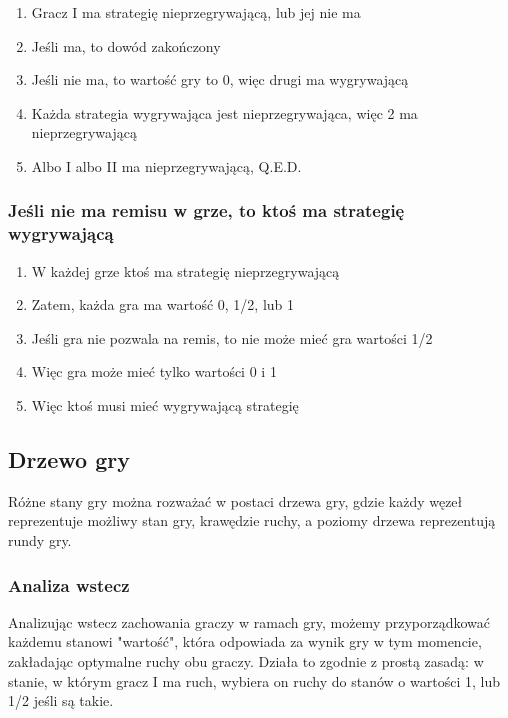 \documentclass{../notatki}
\begin{document}
\begin{enumerate}
  \item Gracz I ma strategię nieprzegrywającą, lub jej nie ma
  \item Jeśli ma, to dowód zakończony
  \item Jeśli nie ma, to wartość gry to 0, więc drugi ma wygrywającą
  \item Każda strategia wygrywająca jest nieprzegrywająca, więc 2 ma
    nieprzegrywającą
  \item Albo I albo II ma nieprzegrywającą, Q.E.D.
\end{enumerate}

\subsubsection{Jeśli nie ma remisu w grze, to ktoś ma strategię wygrywającą}

\begin{enumerate}
  \item W każdej grze ktoś ma strategię nieprzegrywającą
  \item Zatem, każda gra ma wartość 0, 1/2, lub 1
  \item Jeśli gra nie pozwala na remis, to nie może mieć gra wartości 1/2
  \item Więc gra może mieć tylko wartości 0 i 1
  \item Więc ktoś musi mieć wygrywającą strategię
\end{enumerate}

\subsection{Drzewo gry}

Różne stany gry można rozważać w postaci drzewa gry, gdzie każdy węzeł
reprezentuje możliwy stan gry, krawędzie ruchy, a poziomy drzewa reprezentują
rundy gry.

\subsubsection{Analiza wstecz}

Analizując wstecz zachowania graczy w ramach gry, możemy przyporządkować
każdemu stanowi "wartość", która odpowiada za wynik gry w tym
momencie, zakładając optymalne ruchy obu graczy. Działa to zgodnie z prostą
zasadą: w stanie, w którym gracz I ma ruch, wybiera on ruchy do stanów o
wartości 1, lub 1/2 jeśli są takie.
\end{document}
